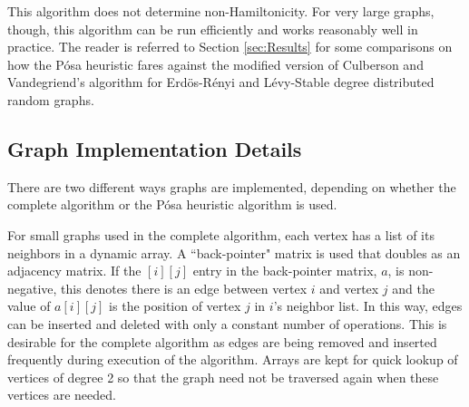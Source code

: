 \documentclass[twoside,11pt]{article}
\begin{document}

This algorithm does not determine non-Hamiltonicity.  For very large graphs, though, this algorithm can be run efficiently
and works reasonably well in practice.  The reader is referred to Section \ref{sec:Results} for some comparisons on how
the P\'osa heuristic fares against the modified version of Culberson and Vandegriend's algorithm
for Erd\"os-R\'enyi and L\'evy-Stable degree distributed random graphs.


\subsection{Graph Implementation Details}

There are two different ways graphs are implemented, depending on whether the complete algorithm or the
P\'osa heuristic algorithm is used.

For small graphs used in the complete algorithm, each vertex has a list of its neighbors in a dynamic array.  A ``back-pointer"
matrix is used that doubles as an adjacency matrix.  If the $[i][j]$ entry in the
back-pointer matrix, $a$, is non-negative, this denotes there is an edge between vertex $i$ and vertex $j$ and the value of $a[i][j]$ is
the position of vertex $j$ in $i$'s neighbor list.  In this way, edges can be inserted and deleted with only a constant number of operations.
This is
desirable for the complete algorithm as edges are being removed and inserted frequently during execution of the algorithm.  Arrays are kept for
quick lookup of vertices of degree 2 so that the graph need not be traversed again when these vertices are needed.
\end{document}

